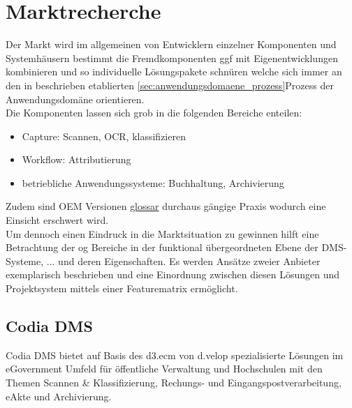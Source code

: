 \documentclass[11pt,oneside,a4paper,notitlepage]{article}
\newcommand{\brand}{Projektsystem }
\begin{document}
%
\section{Marktrecherche}

\begin{comment}
Die Marktrecherche, auch related works genannt, beinhaltet die Recherche nach konkurrierenden Systemen, die teilweise oder vollständig die Funktionalitäten aufweisen wie sie für das zu entwickelte System geplant sind. Dabei sollte man Vor- und Nachteile gegenüber dem zu entwickelten System herausstellen. 
\end{comment}

Der Markt wird im allgemeinen von Entwicklern einzelner Komponenten und Systemhäusern bestimmt die Fremdkomponenten ggf mit Eigenentwicklungen kombinieren und so individuelle Lösungspakete schnüren welche sich immer an den in beschrieben etablierten \ref{sec:anwendungsdomaene_prozess}{Prozess} der Anwendungsdomäne orientieren.\\
Die Komponenten lassen sich grob in die folgenden Bereiche enteilen:
\begin{itemize}
\item Capture: Scannen, OCR, klassifizieren
\item Workflow: Attributierung
\item betriebliche Anwendungssysteme: Buchhaltung, Archivierung
\end{itemize}
\noindent
Zudem sind OEM Versionen \href{}{glossar} durchaus gängige Praxis wodurch eine Einsicht erschwert wird.\\
Um dennoch einen Eindruck in die Marktsituation zu gewinnen hilft eine Betrachtung der og Bereiche in der funktional übergeordneten Ebene der DMS-Systeme, ... 
%
und deren Eigenschaften. Es werden Ansätze zweier Anbieter exemplarisch beschrieben und eine Einordnung zwischen diesen Lösungen und \brand mittels einer Featurematrix ermöglicht.


\subsection{Codia DMS }
%
%
Codia DMS bietet auf Basis des d3.ecm von d.velop spezialisierte Lösungen im eGovernment Umfeld für öffentliche Verwaltung und Hochschulen mit den Themen Scannen & Klassifizierung, Rechungs- und Eingangspostverarbeitung, eAkte und Archivierung.
\end{document}

